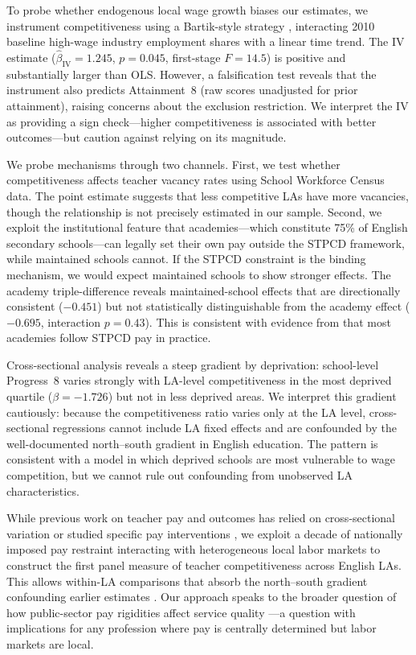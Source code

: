 \documentclass[12pt]{article}
\begin{document}
To probe whether endogenous local wage growth biases our estimates, we instrument competitiveness using a Bartik-style strategy \citep{goldsmith2020bartik}, interacting 2010 baseline high-wage industry employment shares with a linear time trend. The IV estimate ($\hat{\beta}_{\text{IV}} = 1.245$, $p = 0.045$, first-stage $F = 14.5$) is positive and substantially larger than OLS. However, a falsification test reveals that the instrument also predicts Attainment~8 (raw scores unadjusted for prior attainment), raising concerns about the exclusion restriction. We interpret the IV as providing a sign check---higher competitiveness is associated with better outcomes---but caution against relying on its magnitude.

We probe mechanisms through two channels. First, we test whether competitiveness affects teacher vacancy rates using School Workforce Census data. The point estimate suggests that less competitive LAs have more vacancies, though the relationship is not precisely estimated in our sample. Second, we exploit the institutional feature that academies---which constitute 75\% of English secondary schools---can legally set their own pay outside the STPCD framework, while maintained schools cannot. If the STPCD constraint is the binding mechanism, we would expect maintained schools to show stronger effects. The academy triple-difference reveals maintained-school effects that are directionally consistent ($-0.451$) but not statistically distinguishable from the academy effect ($-0.695$, interaction $p = 0.43$). This is consistent with evidence from \citet{britton2016teacher} that most academies follow STPCD pay in practice.

Cross-sectional analysis reveals a steep gradient by deprivation: school-level Progress~8 varies strongly with LA-level competitiveness in the most deprived quartile ($\beta = -1.726$) but not in less deprived areas. We interpret this gradient cautiously: because the competitiveness ratio varies only at the LA level, cross-sectional regressions cannot include LA fixed effects and are confounded by the well-documented north--south gradient in English education. The pattern is consistent with a model in which deprived schools are most vulnerable to wage competition, but we cannot rule out confounding from unobserved LA characteristics.

While previous work on teacher pay and outcomes has relied on cross-sectional variation or studied specific pay interventions \citep{britton2016teacher, dolton2011if, hendricks2014relative, hoxby1996teachers}, we exploit a decade of nationally imposed pay restraint interacting with heterogeneous local labor markets to construct the first panel measure of teacher competitiveness across English LAs. This allows within-LA comparisons that absorb the north--south gradient confounding earlier estimates \citep{sims2020teacher, allen2018understanding, burgess2019teacher}. Our approach speaks to the broader question of how public-sector pay rigidities affect service quality \citep{clotfelter2008would}---a question with implications for any profession where pay is centrally determined but labor markets are local.
\end{document}
